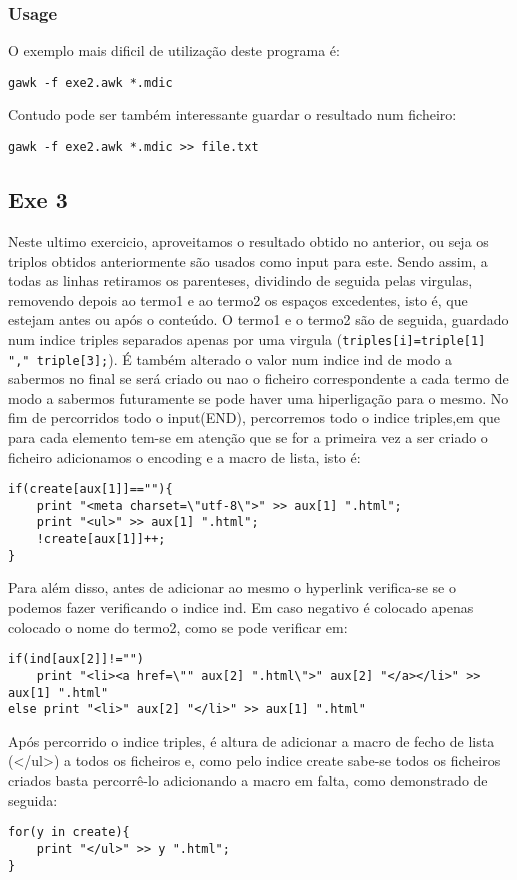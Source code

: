 \documentclass{llncs}
\begin{document}
\subsubsection{Usage}
O exemplo mais dificil de utilização deste programa é:
\begin{verbatim}
gawk -f exe2.awk *.mdic
\end{verbatim}
Contudo pode ser também interessante guardar o resultado num ficheiro:
\begin{verbatim}
gawk -f exe2.awk *.mdic >> file.txt
\end{verbatim}

\subsection{Exe 3}
Neste ultimo exercicio, aproveitamos o resultado obtido no anterior, ou seja os triplos obtidos anteriormente são usados como input para este. Sendo assim, a todas as linhas retiramos os parenteses, dividindo de seguida pelas virgulas, removendo depois ao termo1 e ao termo2 os espaços excedentes, isto é, que estejam antes ou após o conteúdo. O termo1 e o termo2 são de seguida, guardado num indice triples separados apenas por uma virgula (\verb|triples[i]=triple[1] "," triple[3];|). É também alterado o valor num indice ind de modo a sabermos no final se será criado ou nao o ficheiro correspondente a cada termo de modo a sabermos futuramente se pode haver uma hiperligação para o mesmo. No fim de percorridos todo o input(END), percorremos todo o indice triples,em que para cada elemento tem-se em atenção que se for a primeira vez a ser criado o ficheiro adicionamos o encoding e a macro de lista, isto é:
\begin{verbatim}
if(create[aux[1]]==""){
    print "<meta charset=\"utf-8\">" >> aux[1] ".html";
    print "<ul>" >> aux[1] ".html";
    !create[aux[1]]++;
}
\end{verbatim}
Para além disso, antes de adicionar ao mesmo o hyperlink verifica-se se o podemos fazer verificando o indice ind. Em caso negativo é colocado apenas colocado o nome do termo2, como se pode verificar em:
\begin{verbatim}
if(ind[aux[2]]!="") 
    print "<li><a href=\"" aux[2] ".html\">" aux[2] "</a></li>" >> aux[1] ".html"
else print "<li>" aux[2] "</li>" >> aux[1] ".html"
\end{verbatim}
Após percorrido o indice triples, é altura de adicionar a macro de fecho de lista (</ul>)
a todos os ficheiros e, como pelo indice create sabe-se todos os ficheiros criados basta percorrê-lo adicionando a macro em falta, como demonstrado de seguida:
\begin{verbatim}
for(y in create){
    print "</ul>" >> y ".html";
}
\end{verbatim}
\end{document}
